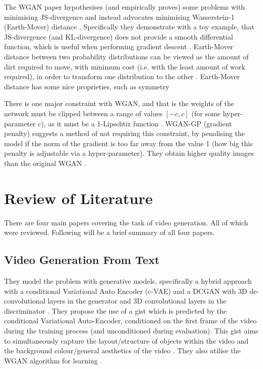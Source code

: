 \documentclass{article}
\begin{document}
The WGAN paper hypothesises (and empirically proves) some problems with minimising JS-divergence and 
instead advocates minimising Wasserstein-1 (Earth-Mover) distance \cite{arjovsky_wasserstein_2017}. Specifically 
they demonstrate with a toy example, that JS-divergence (and KL-divergence) does not provide a smooth differential 
function, which is useful when performing gradient descent \cite{weng_gan_nodate}. Earth-Mover distance between two 
probability distributions can be viewed as the amount of dirt required to move, with minimum cost (i.e. with the least amount of work required), in order to transform one distribution to the other \cite{arjovsky_wasserstein_2017}. Earth-Mover 
distance has some nice proprieties, such as symmetry

There is one major constraint with WGAN, and that is the weights of the network must be clipped between a range of values $[-c, c]$ (for some hyper-parameter $c$), as it 
must be a 1-Lipschtiz function \cite{arjovsky_wasserstein_2017}. WGAN-GP (gradient penalty) suggests a method of not requiring this constraint, by penalising the model
if the norm of the gradient is too far away from the value 1 (how big this penalty is adjustable via a hyper-parameter). They obtain higher quality
images than the original WGAN \cite{gulrajani_improved_2017}.

\section{Review of Literature}

There are four main papers covering the task of video generation. All of which were reviewed. Following will be a brief summary of all four papers.

\subsection{Video Generation From Text}

They model the problem with generative models, specifically a hybrid approach with a conditional Variational Auto Encoder (c-VAE) and a DCGAN with 3D de-convolutional layers in the generator and 3D convolutional layers in the discriminator \cite{li_video_2017}. They propose the use of a gist which is predicted by the conditional Variational Auto-Encoder, conditioned on the first frame of the video during the training process (and unconditioned during evaluation). This gist aims to simultaneously
capture the layout/structure of objects within the video and the background colour/general aesthetics of the video \cite{li_video_2017}. They also utilise the WGAN algorithm for learning \cite{arjovsky_wasserstein_2017}.
\end{document}
